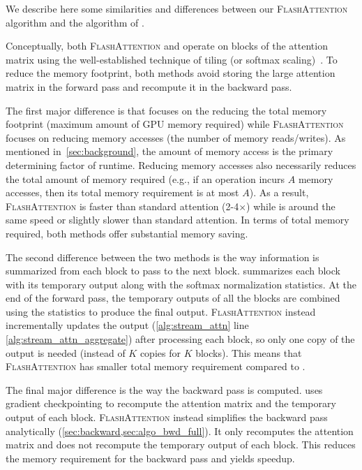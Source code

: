 \documentclass{article}
\newcommand{\sysname}{\textsc{FlashAttention}\xspace}
\begin{document}
We describe here some similarities and differences between our \sysname
algorithm and the algorithm of \citet{rabe2021self}.

Conceptually, both \sysname and \citet{rabe2021self} operate on blocks of the
attention matrix using the well-established technique of tiling (or softmax
scaling)~\citep{milakov2018online, kitaev2020reformer}.
To reduce the memory footprint, both methods avoid storing the large attention
matrix in the forward pass and recompute it in the backward pass.

The first major difference is that \citet{rabe2021self} focuses on the reducing
the total memory footprint (maximum amount of GPU memory required) while
\sysname focuses on reducing memory accesses (the number of memory
reads/writes).
As mentioned in~\cref{sec:background}, the amount of memory access is the
primary determining factor of runtime.
Reducing memory accesses also necessarily reduces the total amount of memory
required (e.g., if an operation incurs $A$ memory accesses, then its total
memory requirement is at most $A$).
As a result, \sysname is faster than standard attention (2-4$\times$) while
\citet{rabe2021self} is around the same speed or slightly slower than standard
attention.
In terms of total memory required, both methods offer substantial memory saving.

The second difference between the two methods is the way information is summarized
from each block to pass to the next block.
\citet{rabe2021self} summarizes each block with its temporary output along with the
softmax normalization statistics.
At the end of the forward pass, the temporary outputs of all the blocks are combined using
the statistics to produce the final output.
\sysname instead incrementally updates the output (\cref{alg:stream_attn} line
\ref{alg:stream_attn_aggregate}) after processing each block, so only one copy
of the output is needed (instead of $K$ copies for $K$ blocks).
This means that \sysname has smaller total memory requirement compared to \citet{rabe2021self}.

The final major difference is the way the backward pass is computed.
\citet{rabe2021self} uses gradient checkpointing to recompute the attention
matrix and the temporary output of each block.
\sysname instead simplifies the backward pass analytically (\cref{sec:backward,sec:algo_bwd_full}).
It only recomputes the attention matrix and does not recompute the
temporary output of each block.
This reduces the memory requirement for the backward pass and yields speedup.
\end{document}
